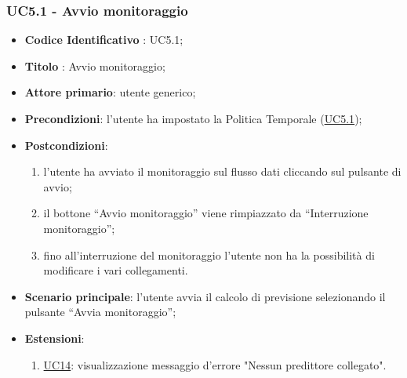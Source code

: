 	\label{par:UC5.1}
	\subsubsection{UC5.1 - Avvio monitoraggio}
		\begin{itemize}
			\item\textbf{Codice Identificativo} : UC5.1;
			\item\textbf{Titolo} : Avvio monitoraggio;
			\item\textbf{Attore primario}: utente generico;
			\item\textbf{Precondizioni}: l'utente ha impostato la Politica Temporale (\hyperref[par:UC5.1]{UC5.1});
			\item\textbf{Postcondizioni}:
				\begin{enumerate}
					\item l'utente ha avviato il monitoraggio sul flusso dati cliccando sul pulsante di avvio;
					\item il bottone “Avvio monitoraggio” viene rimpiazzato da “Interruzione monitoraggio”;
					\item fino all'interruzione del monitoraggio l'utente non ha la possibilità di modificare i vari collegamenti.
				\end{enumerate}
			\item\textbf{Scenario principale}: l'utente avvia il calcolo di previsione selezionando il pulsante “Avvia monitoraggio”;
			\item\textbf{Estensioni}:
				\begin{enumerate}
					\item \hyperref[par:UC14]{UC14}: visualizzazione messaggio d'errore "Nessun predittore collegato".
				\end{enumerate}
			
				
		\end{itemize}	
		
		\label{par:UC5.2}
